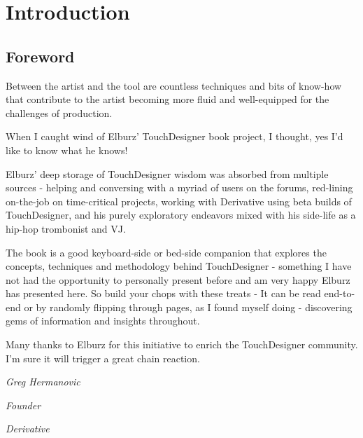 
\cleardoublepage
\chapter{Introduction}
\label{introduction}

\section{Foreword}

\vspace{10mm}

\begin{fullwidth}
Between the artist and the tool are countless techniques and bits of know-how that contribute to the artist becoming more fluid and well-equipped for the challenges of production.
 
When I caught wind of Elburz' TouchDesigner book project, I thought, yes I'd like to know what he knows!
 
Elburz' deep storage of TouchDesigner wisdom was absorbed from multiple sources - helping and conversing with a myriad of users on the forums, red-lining on-the-job on time-critical projects, working with Derivative using beta builds of TouchDesigner, and his purely exploratory endeavors mixed with his side-life as a hip-hop trombonist and VJ.
 
The book is a good keyboard-side or bed-side companion that explores the concepts, techniques and methodology behind TouchDesigner - something I have not had the opportunity to personally present before and am very happy Elburz has presented here. So build your chops with these treats - It can be read end-to-end or by randomly flipping through pages, as I found myself doing - discovering gems of information and insights throughout.
 
Many thanks to Elburz for this initiative to enrich the TouchDesigner community. I'm sure it will trigger a great chain reaction.

\vspace{10mm}

\textit{Greg Hermanovic}

\textit{Founder}

\textit{Derivative}

\clearpage

\end{fullwidth}


